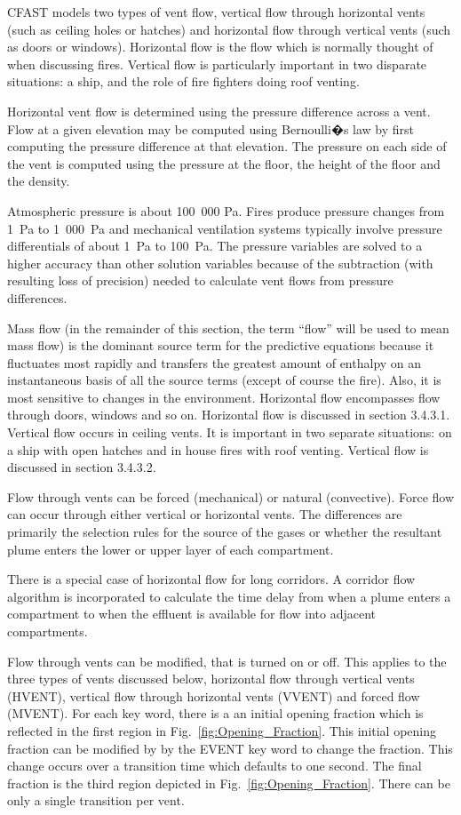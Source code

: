 CFAST models two types of vent flow, vertical flow through horizontal vents (such as ceiling holes or hatches) and horizontal flow through vertical vents (such as doors or windows).  Horizontal flow is the flow which is normally thought of when discussing fires.  Vertical flow is particularly important in two disparate situations: a ship, and the role of fire fighters doing roof venting.

Horizontal vent flow is determined using the pressure difference across a vent.  Flow at a given elevation may be computed using Bernoulli�s law by first computing the pressure difference at that elevation.  The pressure on each side of the vent is computed using the pressure at the floor, the height of the floor and the density.

Atmospheric pressure is about 100~000 Pa. Fires produce pressure changes from 1~Pa to 1~000~Pa and mechanical ventilation systems typically involve pressure differentials of about 1~Pa to 100~Pa.  The pressure variables are solved to a higher accuracy than other solution variables because of the subtraction (with resulting loss of precision) needed to calculate vent flows from pressure differences.

Mass flow (in the remainder of this section, the term ``flow'' will be used to mean mass flow) is the dominant source term for the predictive equations because it fluctuates most rapidly and transfers the greatest amount of enthalpy on an instantaneous basis of all the source terms (except of course the fire).  Also, it is most sensitive to changes in the environment.  Horizontal flow encompasses flow through doors, windows and so on. Horizontal flow is discussed in section 3.4.3.1. Vertical flow occurs in ceiling vents.  It is important in two separate situations: on a ship with open hatches and in house fires with roof venting.  Vertical flow is discussed in section 3.4.3.2.

Flow through vents can be forced (mechanical) or natural (convective). Force flow can occur through either vertical or horizontal vents. The differences are primarily the selection rules for the source of the gases or whether the resultant plume enters the lower or upper layer of each compartment.

There is a special case of horizontal flow for long corridors. A corridor flow algorithm is incorporated to calculate the time delay from when a plume enters a compartment to when the effluent is available for flow into adjacent compartments.

Flow through vents can be modified, that is turned on or off. This applies to the three types of vents discussed below, horizontal flow through vertical vents (HVENT), vertical flow through horizontal vents (VVENT) and forced flow (MVENT). For each key word, there is a an initial opening fraction which is reflected in the first region in Fig.~\ref{fig:Opening_Fraction}. This initial opening fraction can be modified by by the EVENT key word to change the fraction. This change occurs over a transition time which defaults to one second. The final fraction is the third region depicted in Fig.~\ref{fig:Opening_Fraction}. There can be only a single transition per vent.

